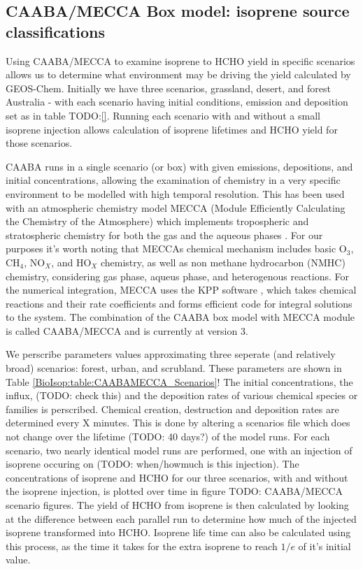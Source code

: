   \subsection{CAABA/MECCA Box model: isoprene source classifications}
    \label{BioIsop:Methods:CM}
    
    Using CAABA/MECCA to examine isoprene to HCHO yield in specific scenarios allows us to determine what environment may be driving the yield calculated by GEOS-Chem.
    Initially we have three scenarios, grassland, desert, and forest Australia - with each scenario having initial conditions, emission and deposition set as in table TODO:\ref{}.
    Running each scenario with and without a small isoprene injection allows calculation of isoprene lifetimes and HCHO yield for those scenarios.
    
    CAABA runs in a single scenario (or box) with given emissions, depositions, and initial concentrations, allowing the examination of chemistry in a very specific environment to be modelled with high temporal resolution.
    This has been used with an atmospheric chemistry model MECCA (Module Efficiently Calculating the Chemistry of the Atmosphere) which implements tropospheric and stratospheric chemistry for both the gas and the aqueous phases \parencite{Sander2005}.
    For our purposes it's worth noting that MECCAs chemical mechanism includes basic O$_3$, CH$_4$, NO$_X$, and HO$_X$ chemistry, as well as non methane hydrocarbon (NMHC) chemistry, considering gas phase, aqueus phase, and heterogenous reactions. \parencite{Sander2005}
    For the numerical integration, MECCA uses the KPP software \parencite{SanduSander2006}, which takes chemical reactions and their rate coefficients and forms efficient code for integral solutions to the system.
    The combination of the CAABA box model with MECCA module is called CAABA/MECCA and is currently at version 3.
    
    
    We perscribe parameters values approximating three seperate (and relatively broad) scenarios: forest, urban, and scrubland.
    These parameters are shown in Table \ref{BioIsop:table:CAABAMECCA_Scenarios}!
    The initial concentrations, the influx, (TODO: check this) and the deposition rates of various chemical species or families is perscribed.
    Chemical creation, destruction and deposition rates are determined every X minutes.
    This is done by altering a scenarios file which does not change over the lifetime (TODO: 40 days?) of the model runs.
    For each scenario, two nearly identical model runs are performed, one with an injection of isoprene occuring on (TODO: when/howmuch is this injection).
    The concentrations of isoprene and HCHO for our three scenarios, with and without the isoprene injection, is plotted over time in figure TODO: CAABA/MECCA scenario figures.
    The yield of HCHO from isoprene is then calculated by looking at the difference between each parallel run to determine how much of the injected isoprene transformed into HCHO.
    Isoprene life time can also be calculated using this process, as the time it takes for the extra isoprene to reach $1/e$ of it's initial value.
    
